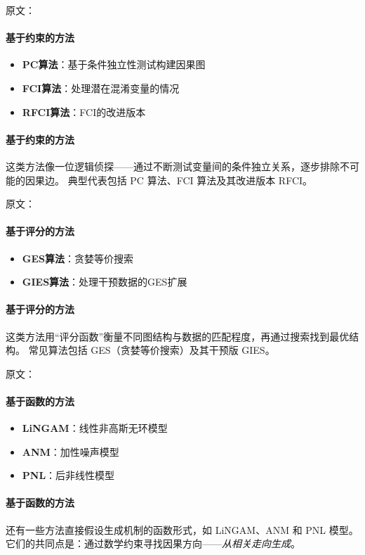原文：
\paragraph{基于约束的方法}
\begin{itemize}
\item \textbf{PC算法}：基于条件独立性测试构建因果图
\item \textbf{FCI算法}：处理潜在混淆变量的情况
\item \textbf{RFCI算法}：FCI的改进版本
\end{itemize}
\paragraph{基于约束的方法}
这类方法像一位逻辑侦探——通过不断测试变量间的条件独立关系，逐步排除不可能的因果边。  
典型代表包括 PC 算法、FCI 算法及其改进版本 RFCI。

原文：
\paragraph{基于评分的方法}
\begin{itemize}
\item \textbf{GES算法}：贪婪等价搜索
\item \textbf{GIES算法}：处理干预数据的GES扩展
\end{itemize}
\paragraph{基于评分的方法}
这类方法用“评分函数”衡量不同图结构与数据的匹配程度，再通过搜索找到最优结构。  
常见算法包括 GES（贪婪等价搜索）及其干预版 GIES。

原文：
\paragraph{基于函数的方法}
\begin{itemize}
\item \textbf{LiNGAM}：线性非高斯无环模型
\item \textbf{ANM}：加性噪声模型
\item \textbf{PNL}：后非线性模型
\end{itemize}
\paragraph{基于函数的方法}
还有一些方法直接假设生成机制的函数形式，如 LiNGAM、ANM 和 PNL 模型。  
它们的共同点是：通过数学约束寻找因果方向——\emph{从相关走向生成}。

